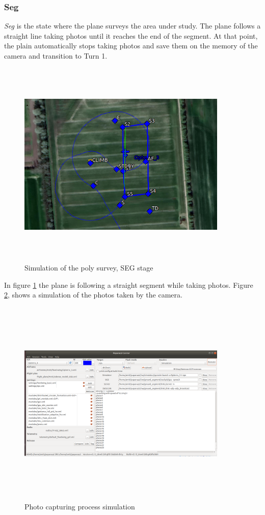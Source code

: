 \subsubsection{Seg}
\textit{Seg} is the state where the plane surveys the area under study. The plane follows a straight line taking photos until it reaches the end of the segment. At that point, the plain automatically stops taking photos and save them on the memory of the camera and transition to Turn 1.
\begin{figure}[H]
\centering
\includegraphics[width=10cm,height=10cm,keepaspectratio]{imagenes/SEG.png}
\caption{Simulation of the poly survey, SEG stage}
\label{fig:SEG_stage}
\end{figure}

In figure \ref{fig:SEG_stage} the plane is following a straight segment while taking photos. Figure \ref{fig:Photos}, shows a simulation of the photos taken by the camera.
\begin{figure}[H]
\centering
\includegraphics[width=10cm,height=10cm,keepaspectratio]{imagenes/Photos.png}
\caption{Photo capturing process simulation}
\label{fig:Photos}
\end{figure}

